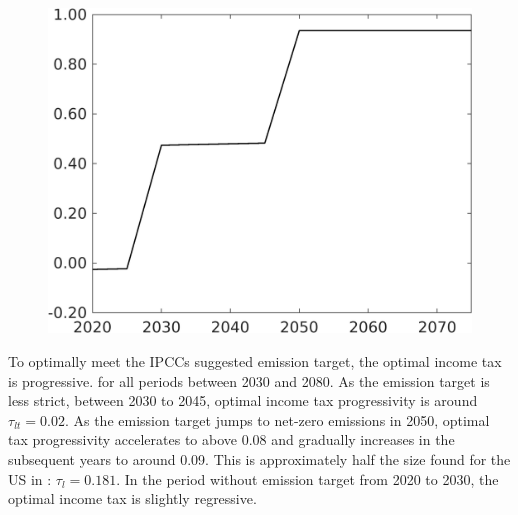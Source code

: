 \begin{figure}[h!!]
\begin{minipage}[]{0.4\textwidth}
		\includegraphics[width=1\textwidth]{../../codding_model/own_basedOnFried/optimalPol_elastS_DisuSci/figures/all_1705/Single_OPT_T_NoTaus_tauf_spillover0_sep1_BN0_ineq0_etaa0.79.png}
	\end{minipage}
\end{figure} 
To optimally meet the IPCCs suggested emission target, the optimal income tax is progressive. for all periods between 2030 and 2080. As the emission target is less strict, between 2030 to 2045, optimal income tax progressivity is around $\tau_{lt}=0.02$. As the emission target jumps to net-zero emissions in 2050, optimal tax progressivity accelerates to above 0.08 and gradually increases in the subsequent years to around 0.09. This is approximately half the size found for the US in \cite{Heathcote2017OptimalFramework}: $\tau_{l}=0.181$. 
In the period without emission target from 2020 to 2030, the optimal income tax is slightly regressive.

